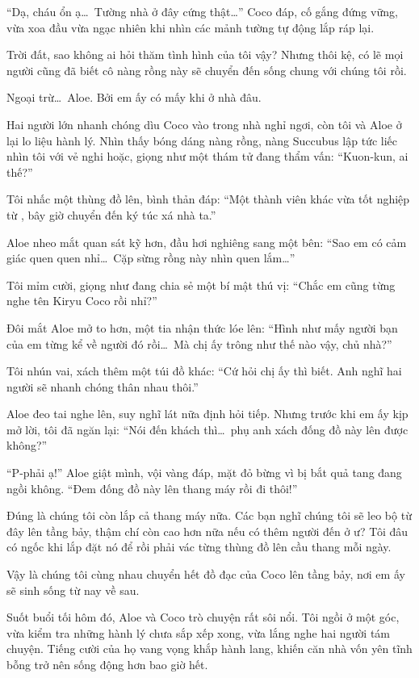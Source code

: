 \documentclass[../main.tex]{subfiles}
\begin{document}
``Dạ, cháu ổn ạ\dots\ Tường nhà ở đây cứng thật\dots'' Coco đáp, cố gắng đứng vững, vừa xoa đầu vừa ngạc nhiên khi nhìn các mảnh tường tự động lắp ráp lại.

Trời đất, sao không ai hỏi thăm tình hình của tôi vậy? Nhưng thôi kệ, có lẽ mọi người cũng đã biết cô nàng rồng này sẽ chuyển đến sống chung với chúng tôi rồi.

Ngoại trừ\dots\ Aloe. Bởi em ấy có mấy khi ở nhà đâu.

Hai người lớn nhanh chóng dìu Coco vào trong nhà nghỉ ngơi, còn tôi và Aloe ở lại lo liệu hành lý. Nhìn thấy bóng dáng nàng rồng, nàng Succubus lập tức liếc nhìn tôi với vẻ nghi hoặc, giọng như một thám tử đang thẩm vấn: ``Kuon-kun, ai thế?''

Tôi nhấc một thùng đồ lên, bình thản đáp: ``Một thành viên khác vừa tốt nghiệp từ \hll, bây giờ chuyển đến ký túc xá nhà ta.''

Aloe nheo mắt quan sát kỹ hơn, đầu hơi nghiêng sang một bên: ``Sao em có cảm giác quen quen nhỉ\dots\ Cặp sừng rồng này nhìn quen lắm\dots''

Tôi mỉm cười, giọng như đang chia sẻ một bí mật thú vị: ``Chắc em cũng từng nghe tên Kiryu Coco rồi nhỉ?''

Đôi mắt Aloe mở to hơn, một tia nhận thức lóe lên: ``Hình như mấy người bạn của em từng kể về người đó rồi\dots\ Mà chị ấy trông như thế nào vậy, chủ nhà?''

Tôi nhún vai, xách thêm một túi đồ khác: ``Cứ hỏi chị ấy thì biết. Anh nghĩ hai người sẽ nhanh chóng thân nhau thôi.''

Aloe đeo tai nghe lên, suy nghĩ lát nữa định hỏi tiếp. Nhưng trước khi em ấy kịp mở lời, tôi đã ngăn lại: ``Nói đến khách thì\dots\ phụ anh xách đống đồ này lên được không?''

``P-phải ạ!'' Aloe giật mình, vội vàng đáp, mặt đỏ bừng vì bị bắt quả tang đang ngồi không. ``Đem đống đồ này lên thang máy rồi đi thôi!''

Đúng là chúng tôi còn lắp cả thang máy nữa. Các bạn nghĩ chúng tôi sẽ leo bộ từ đây lên tầng bảy, thậm chí còn cao hơn nữa nếu có thêm người đến ở ư? Tôi đâu có ngốc khi lắp đặt nó để rồi phải vác từng thùng đồ lên cầu thang mỗi ngày.

Vậy là chúng tôi cùng nhau chuyển hết đồ đạc của Coco lên tầng bảy, nơi em ấy sẽ sinh sống từ nay về sau.

\ct

Suốt buổi tối hôm đó, Aloe và Coco trò chuyện rất sôi nổi. Tôi ngồi ở một góc, vừa kiểm tra những hành lý chưa sắp xếp xong, vừa lắng nghe hai người tám chuyện. Tiếng cười của họ vang vọng khắp hành lang, khiến căn nhà vốn yên tĩnh bỗng trở nên sống động hơn bao giờ hết.
\end{document}
